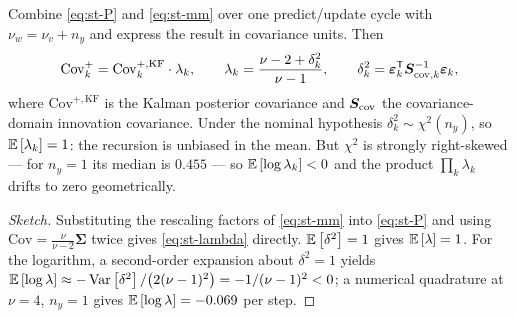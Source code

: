 \begin{proposition}\label{prop:st-collapse}
Combine \eqref{eq:st-P} and \eqref{eq:st-mm} over one predict/update cycle with
$\nu_w=\nu_v+n_y$ and express the result in covariance units.  Then
\begin{equation}
\mathrm{Cov}^+_k = \mathrm{Cov}^{+,\mathrm{KF}}_k\cdot\lambda_k,
\qquad
\lambda_k=\frac{\nu-2+\delta_k^2}{\nu-1},
\qquad
\delta_k^2=\bm{\varepsilon}_k^{\mathsf{T}}\bm{S}_{\mathrm{cov},k}^{-1}\bm{\varepsilon}_k,
\label{eq:st-lambda}
\end{equation}
where $\mathrm{Cov}^{+,\mathrm{KF}}$ is the Kalman posterior covariance and
$\bm{S}_{\mathrm{cov}}$ the covariance-domain innovation covariance.  Under the nominal hypothesis
$\delta_k^2\sim\chi^2(n_y)$, so $\mathbb{E}\left[\lambda_k\right]=1$: the recursion is unbiased in the mean.  But
$\chi^2$ is strongly right-skewed --- for $n_y=1$ its median is $0.455$ --- so
$\mathbb{E}\left[\log\lambda_k\right]<0$ and the product $\prod_k\lambda_k$ drifts to zero geometrically.
\end{proposition}
\begin{proof}[Sketch]
Substituting the rescaling factors of \eqref{eq:st-mm} into \eqref{eq:st-P} and using
$\mathrm{Cov}=\frac{\nu}{\nu-2}\bm\Sigma$ twice gives \eqref{eq:st-lambda} directly.
$\mathbb{E}\left[\delta^2\right]=1$ gives $\mathbb{E}\left[\lambda\right]=1$.  For the logarithm, a second-order expansion about
$\delta^2=1$ yields $\mathbb{E}\left[\log\lambda\right]\approx-\operatorname{Var}\left[\delta^2\right]/\big(2(\nu-1)^2\big)=-1/(\nu-1)^2<0$;
a numerical quadrature at $\nu=4$, $n_y=1$ gives $\mathbb{E}\left[\log\lambda\right]=-0.069$ per step.
\end{proof}

